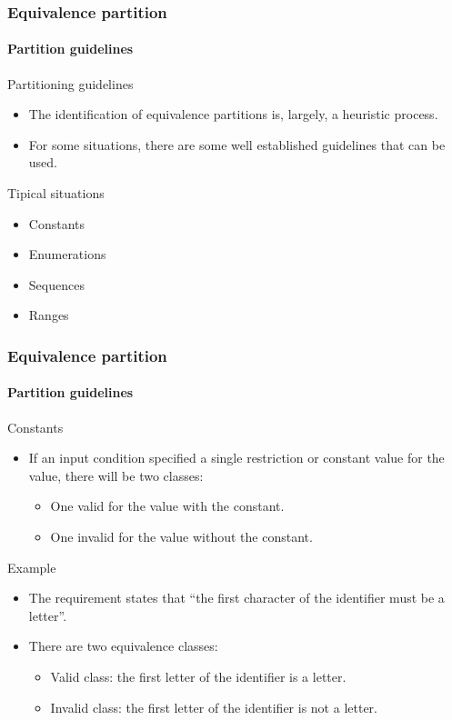\begin{frame}
\frametitle{Equivalence partition}
\framesubtitle{Partition guidelines}

\begin{block:fact}{Partitioning guidelines}
\begin{itemize}
	\item The identification of equivalence partitions is, largely, a
	heuristic process.

	\item For some situations, there are some well established guidelines
	that can be used.
\end{itemize}
\end{block:fact}

\begin{block:fact}{Tipical situations}
\begin{itemize}
	\item Constants
	\item Enumerations
	\item Sequences
	\item Ranges
\end{itemize}
\end{block:fact}
\end{frame}


\begin{frame}
\frametitle{Equivalence partition}
\framesubtitle{Partition guidelines}

\begin{block:fact}{Constants}
\begin{itemize}
	\item If an input condition specified a single restriction or constant
	value for the value, there will be two classes:
	\begin{itemize}
		\item One valid for the value with the constant.
		\item One invalid for the value without the constant.
	\end{itemize}
\end{itemize}
\end{block:fact}

\begin{block}{Example}
\begin{itemize}
	\item The requirement states that ``the first character of the identifier
	must be a letter''.

	\item There are two equivalence classes:
	\begin{itemize}
		\item Valid class: the first letter of the identifier is a letter.
		\item Invalid class: the first letter of the identifier is not a
		letter.
	\end{itemize}
\end{itemize}
\end{block}
\end{frame}



